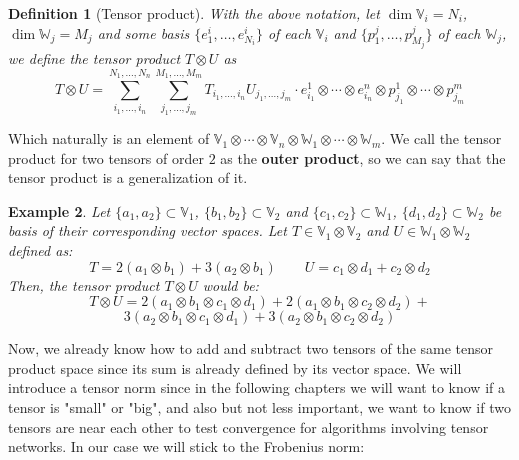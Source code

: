 \documentclass[11pt,a4paper,openright,oneside]{book}
\numberwithin{equation}{section}
\newtheorem{defn0}{Definition}[chapter]
\newtheorem{example0}[defn0]{Example}
\newenvironment{definition}{ \begin{defn0}}{\end{defn0}}
\newenvironment{example}{ \begin{example0}\rm}{\end{example0}}
\begin{document}
\begin{definition}[Tensor product] With the above notation, let $\dim \mathbb{V}_i = N_i$, $\dim \mathbb{W}_j = M_j$
    and some basis $\{e_1^i, \dots, e_{N_i}^i\}$ of each $\mathbb{V}_i$ and $\{p_1^j, \dots, p_{M_j}^j\}$ of each $\mathbb{W}_j$,
    we define the tensor product
    $T \otimes U$ as
    \begin{equation}
        T \otimes U = \sum_{i_1, \dots, i_n}^{N_1, \dots, N_n} \sum_{j_1, \dots, j_m}^{M_1, \dots, M_m} T_{i_1, \dots, i_n} U_{j_1, \dots, j_m} \cdot
    e_{i_1}^1 \otimes \cdots \otimes e_{i_n}^n \otimes p_{j_1}^1 \otimes \cdots \otimes p_{j_m}^m
    \label{eq:tensor_product}
\end{equation}
\end{definition}

Which naturally is an element of $\mathbb{V}_1 \otimes \cdots \otimes \mathbb{V}_n \otimes \mathbb{W}_1 \otimes \cdots \otimes \mathbb{W}_m$.
We call the tensor product for two tensors of order $2$ as the \textbf{outer product}, so we can say that 
the tensor product is a generalization of it.

\begin{example}
    Let $\{a_1, a_2\} \subset \mathbb{V}_1$, $\{b_1, b_2\} \subset \mathbb{V}_2$ and $\{c_1, c_2\} \subset \mathbb{W}_1$, $\{d_1, d_2\} \subset \mathbb{W}_2$ be basis
    of their corresponding vector spaces. Let $T \in \mathbb{V}_1 \otimes \mathbb{V}_2$ and $U \in \mathbb{W}_1 \otimes \mathbb{W}_2$ defined as:
    $$T = 2 (a_1 \otimes b_1) + 3 (a_2 \otimes b_1) \qquad U = c_1 \otimes d_1 + c_2 \otimes d_2$$
    Then, the tensor product $T \otimes U$ would be:
    $$T \otimes U = 2 (a_1 \otimes b_1 \otimes c_1 \otimes d_1) + 2 (a_1 \otimes b_1 \otimes c_2 \otimes d_2) + $$$$
    3 (a_2 \otimes b_1 \otimes c_1 \otimes d_1) + 3 (a_2 \otimes b_1 \otimes c_2 \otimes d_2)$$
\end{example}

Now, we already know how to add and subtract two tensors of the same tensor product space since its sum is already
defined by its vector space. We will introduce a tensor norm since in the following chapters we will want to know if
a tensor is "small" or "big", and also but not less important, we want to know if two tensors are near each other
to test convergence for algorithms involving tensor networks. In our case we will stick to the Frobenius norm:
\end{document}
